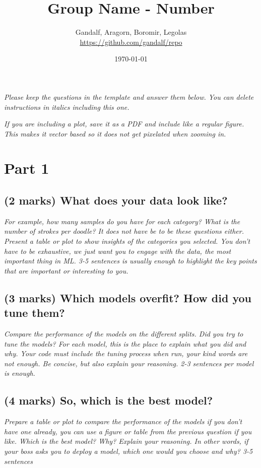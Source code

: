 \documentclass[11pt,a4paper]{article}
\title{Group Name - Number}
\author{Gandalf, Aragorn, Boromir, Legolas \\ \url{https://github.com/gandalf/repo}}
\date{\today}
\begin{document}
\maketitle

\textit{Please keep the questions in the template and answer them below. You can delete instructions in italics including this one.}

\textit{If you are including a plot, save it as a PDF and include like a regular figure. This makes it vector based so it does not get pixelated when zooming in.}

\section{Part 1}

\subsection{(2 marks) What does your data look like?}\label{p1_report_data_distribution}

\textit{For example, how many samples do you have for each category? What is the number of strokes per doodle? It does not have be to be these questions either. Present a table or plot to show insights of the categories you selected. You don't have to be exhaustive, we just want you to engage with the data, the most important thing in ML. 3-5 sentences is usually enough to highlight the key points that are important or interesting to you.}

\subsection{(3 marks) Which models overfit? How did you tune them?}\label{p1_report_overfit_tuning}

\textit{Compare the performance of the models on the different splits. Did you try to tune the models? For each model, this is the place to explain what you did and why. Your code must include the tuning process when run, your kind words are not enough. Be concise, but also explain your reasoning. 2-3 sentences per model is enough.}

\subsection{(4 marks) So, which is the best model?}\label{p1_report_best_model}

\textit{Prepare a table or plot to compare the performance of the models if you don't have one already, you can use a figure or table from the previous question if you like. Which is the best model? Why? Explain your reasoning. In other words, if your boss asks you to deploy a model, which one would you choose and why? 3-5 sentences}
\end{document}
